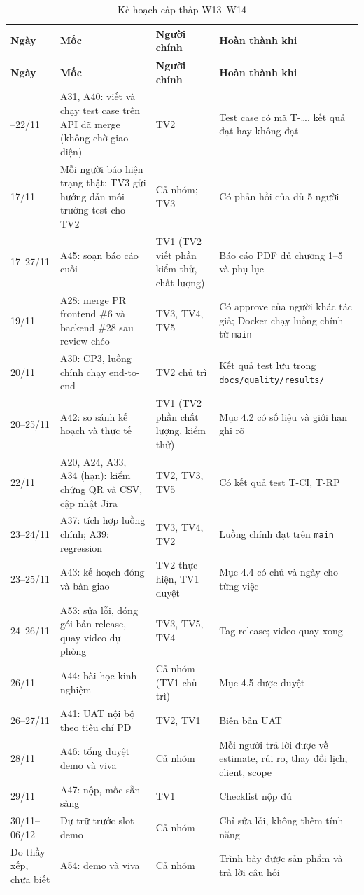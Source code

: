 \begingroup\tblsetup\tblzebra
\begin{longtable}{L{2.2cm}L{4.6cm}L{2.2cm}L{4.4cm}}
\caption{Kế hoạch cấp thấp W13--W14}\label{tab:lower-plan}\\
\toprule
{}\textbf{Ngày} & \textbf{Mốc} & \textbf{Người chính} & \textbf{Hoàn thành khi} \\
\midrule
\endfirsthead
\toprule
{}\textbf{Ngày} & \textbf{Mốc} & \textbf{Người chính} & \textbf{Hoàn thành khi} \\
\midrule
\endhead
\bottomrule
{}--22/11 & A31, A40: viết và chạy test case trên API đã merge (không chờ giao diện) & TV2 & Test case có mã T-\ldots, kết quả đạt hay không đạt \\
17/11 & Mỗi người báo hiện trạng thật; TV3 gửi hướng dẫn môi trường test cho TV2 & Cả nhóm; TV3 & Có phản hồi của đủ 5 người \\
17--27/11 & A45: soạn báo cáo cuối & TV1 (TV2 viết phần kiểm thử, chất lượng) & Báo cáo PDF đủ chương 1--5 và phụ lục \\
19/11 & A28: merge PR frontend \#6 và backend \#28 sau review chéo & TV3, TV4, TV5 & Có approve của người khác tác giả; Docker chạy luồng chính từ \texttt{main} \\
20/11 & A30: CP3, luồng chính chạy end-to-end & TV2 chủ trì & Kết quả test lưu trong \texttt{docs/\allowbreak quality/\allowbreak results/} \\
20--25/11 & A42: so sánh kế hoạch và thực tế & TV1 (TV2 phần chất lượng, kiểm thử) & Mục 4.2 có số liệu và giới hạn ghi rõ \\
22/11 & A20, A24, A33, A34 (hạn): kiểm chứng QR và CSV, cập nhật Jira & TV2, TV3, TV5 & Có kết quả test T-CI, T-RP \\
23--24/11 & A37: tích hợp luồng chính; A39: regression & TV3, TV4, TV2 & Luồng chính đạt trên \texttt{main} \\
23--25/11 & A43: kế hoạch đóng và bàn giao & TV2 thực hiện, TV1 duyệt & Mục 4.4 có chủ và ngày cho từng việc \\
24--26/11 & A53: sửa lỗi, đóng gói bản release, quay video dự phòng & TV3, TV5, TV4 & Tag release; video quay xong \\
26/11 & A44: bài học kinh nghiệm & Cả nhóm (TV1 chủ trì) & Mục 4.5 được duyệt \\
26--27/11 & A41: UAT nội bộ theo tiêu chí PD & TV2, TV1 & Biên bản UAT \\
28/11 & A46: tổng duyệt demo và viva & Cả nhóm & Mỗi người trả lời được về estimate, rủi ro, thay đổi lịch, client, scope \\
29/11 & A47: nộp, mốc sẵn sàng & TV1 & Checklist nộp đủ \\
30/11--06/12 & Dự trữ trước slot demo & Cả nhóm & Chỉ sửa lỗi, không thêm tính năng \\
Do thầy xếp, chưa biết & A54: demo và viva & Cả nhóm & Trình bày được sản phẩm và trả lời câu hỏi \\
\end{longtable}
\endgroup
